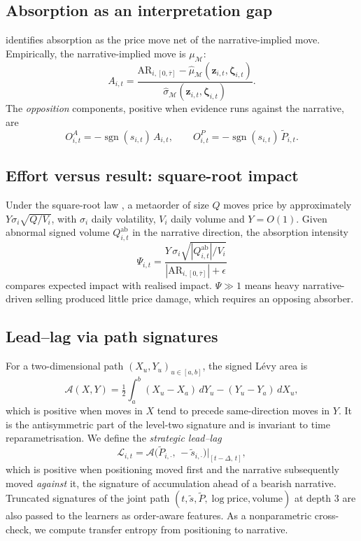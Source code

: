 \documentclass[11pt,a4paper]{article}
\theoremstyle{plain}
\theoremstyle{definition}
\theoremstyle{remark}
\newcommand{\z}{\bm{z}}
\DeclareMathOperator{\sgn}{sgn}
\begin{document}
\subsection{Absorption as an interpretation gap}
 identifies absorption as the price move net of the narrative-implied move. Empirically, the narrative-implied move is $\mu_{\mathcal M}$:
\begin{equation}
  A_{i,t}=\frac{\mathrm{AR}_{i,[0,\bar\tau]}-\hat\mu_{\mathcal M}(\z_{i,t},\bm\zeta_{i,t})}{\hat\sigma_{\mathcal M}(\z_{i,t},\bm\zeta_{i,t})} .
\end{equation}
The \emph{opposition} components, positive when evidence runs against the narrative, are
\begin{equation}
  O^{A}_{i,t}=-\sgn(s_{i,t})\,A_{i,t},\qquad O^{P}_{i,t}=-\sgn(s_{i,t})\,\tilde P_{i,t}.
\end{equation}

\subsection{Effort versus result: square-root impact}
Under the square-root law \citep{bouchaud2018}, a metaorder of size $Q$ moves price by approximately $Y\sigma_i\sqrt{Q/V_i}$, with $\sigma_i$ daily volatility, $V_i$ daily volume and $Y=O(1)$. Given abnormal signed volume $Q^{\mathrm{ab}}_{i,t}$ in the narrative direction, the absorption intensity
\begin{equation}
  \Psi_{i,t}=\frac{Y\,\sigma_i\sqrt{|Q^{\mathrm{ab}}_{i,t}|/V_i}}{|\mathrm{AR}_{i,[0,\bar\tau]}|+\epsilon}
\end{equation}
compares expected impact with realised impact. $\Psi\gg1$ means heavy narrative-driven selling produced little price damage, which requires an opposing absorber.

\subsection{Lead--lag via path signatures}\label{sec:leadlag}
For a two-dimensional path $(X_u,Y_u)_{u\in[a,b]}$, the signed L\'evy area is
\begin{equation}
  \mathcal{A}(X,Y)=\tfrac12\int_a^b (X_u-X_a)\,dY_u-(Y_u-Y_a)\,dX_u,
\end{equation}
which is positive when moves in $X$ tend to precede same-direction moves in $Y$. It is the antisymmetric part of the level-two signature \citep{chevyrev2016} and is invariant to time reparametrisation. We define the \emph{strategic lead--lag}
\begin{equation}
  \mathcal{L}_{i,t}=\mathcal{A}\big(\tilde P_{i,\cdot},\,-\tilde s_{i,\cdot}\big)\Big|_{[t-\Delta,\,t]},
\end{equation}
which is positive when positioning moved first and the narrative subsequently moved \emph{against} it, the signature of accumulation ahead of a bearish narrative. Truncated signatures of the joint path $(t,\tilde s,\tilde P,\log\text{price},\text{volume})$ at depth 3 are also passed to the learners as order-aware features. As a nonparametric cross-check, we compute transfer entropy \citep{schreiber2000} from positioning to narrative.
\end{document}
